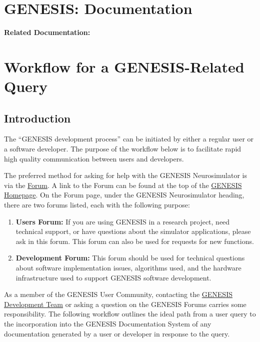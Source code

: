 \documentclass[12pt]{article}
\begin{document}
\section*{GENESIS: Documentation}

{\bf Related Documentation:}

\section*{Workflow for a GENESIS-Related Query}

\subsection*{Introduction}

The ``GENESIS development process'' can be initiated by either a
regular user or a software developer. The purpose of the workflow
below is to facilitate rapid high quality communication between users
and developers.

The preferred method for asking for help with the GENESIS
Neurosimulator is via the
\href{http://www.genesis-sim.org/forum}{Forum}.  A link to the Forum
can be found at the top of the
\href{http://www.genesis-sim.org/}{GENESIS Homepage}.  On the Forum
page, under the GENESIS Neurosimulator heading, there are two forums
listed, each with the following purpose:

\begin{enumerate}
\item {\bf Users Forum:} If you are using GENESIS in a research
  project, need technical support, or have questions about the
  simulator applications, please ask in this forum.  This forum can
  also be used for requests for new functions.
\item {\bf Development Forum:} This forum should be used for technical
  questions about software implementation issues, algorithms used, and
  the hardware infrastructure used to support GENESIS software
  development.
\end{enumerate}

As a member of the GENESIS User Community, contacting the
\href{http://www.genesis-sim.org/contact}{GENESIS Development Team} or
asking a question on the GENESIS Forums carries some responsibility. The
following workflow outlines the ideal path from a user query to the
incorporation into the GENESIS Documentation System of any
documentation generated by a user or developer in response to the query.
\end{document}
